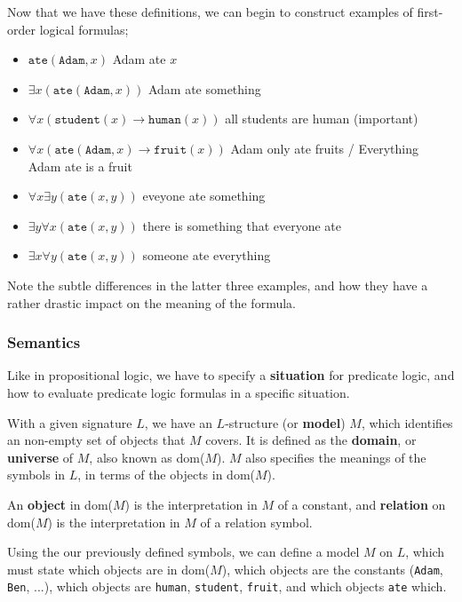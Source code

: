 \documentclass[a4paper, 12pt]{article}
\begin{document}
                Now that we have these definitions, we can begin to construct examples of first-order logical formulas;
                \begin{itemize}
                    \itemsep0em
                    \item $\texttt{ate}(\texttt{Adam}, x)$ \hfill Adam ate $x$
                    \item $\exists x (\texttt{ate}(\texttt{Adam}, x))$ \hfill Adam ate something
                    \item $\forall x (\texttt{student}(x) \rightarrow \texttt{human}(x))$ \hfill all students are human (important)
                    \item $\forall x (\texttt{ate}(\texttt{Adam}, x) \rightarrow \texttt{fruit}(x))$ \hfill Adam only ate fruits / Everything Adam ate is a fruit
                    \item $\forall x \exists y (\texttt{ate}(x, y))$ \hfill eveyone ate something
                    \item $\exists y \forall x (\texttt{ate}(x, y))$ \hfill there is something that everyone ate
                    \item $\exists x \forall y (\texttt{ate}(x, y))$ \hfill someone ate everything
                \end{itemize}
                Note the subtle differences in the latter three examples, and how they have a rather drastic impact on the meaning of the formula.
            \subsubsection*{Semantics}
                Like in propositional logic, we have to specify a \textbf{situation} for predicate logic, and how to evaluate predicate logic formulas in a specific situation.
                \medskip

                With a given signature $L$, we have an $L$-structure (or \textbf{model}) $M$, which identifies an non-empty set of objects that $M$ covers. It is defined as the \textbf{domain}, or \textbf{universe} of $M$, also known as dom($M$). $M$ also specifies the meanings of the symbols in $L$, in terms of the objects in dom($M$).
                \smallskip

                An \textbf{object} in dom($M$) is the interpretation in $M$ of a constant, and \textbf{relation} on dom($M$) is the interpretation in $M$ of a relation symbol.
                \medskip

                Using the our previously defined symbols, we can define a model $M$ on $L$, which must state which objects are in dom($M$), which objects are the constants (\texttt{Adam}, \texttt{Ben}, ...), which objects are \texttt{human}, \texttt{student}, \texttt{fruit}, and which objects \texttt{ate} which.
\end{document}
